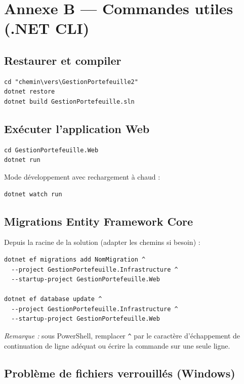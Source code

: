 \chapter{Annexe B — Commandes utiles (.NET CLI)}
\label{ann:cmd}

\section{Restaurer et compiler}

\begin{verbatim}
cd "chemin\vers\GestionPortefeuille2"
dotnet restore
dotnet build GestionPortefeuille.sln
\end{verbatim}

\section{Exécuter l'application Web}

\begin{verbatim}
cd GestionPortefeuille.Web
dotnet run
\end{verbatim}

Mode développement avec rechargement à chaud :

\begin{verbatim}
dotnet watch run
\end{verbatim}

\section{Migrations Entity Framework Core}

Depuis la racine de la solution (adapter les chemins si besoin) :

\begin{verbatim}
dotnet ef migrations add NomMigration ^
  --project GestionPortefeuille.Infrastructure ^
  --startup-project GestionPortefeuille.Web

dotnet ef database update ^
  --project GestionPortefeuille.Infrastructure ^
  --startup-project GestionPortefeuille.Web
\end{verbatim}

\textit{Remarque :} sous PowerShell, remplacer \verb|^| par le caractère d'échappement de continuation de ligne adéquat ou écrire la commande sur une seule ligne.

\section{Problème de fichiers verrouillés (Windows)}

